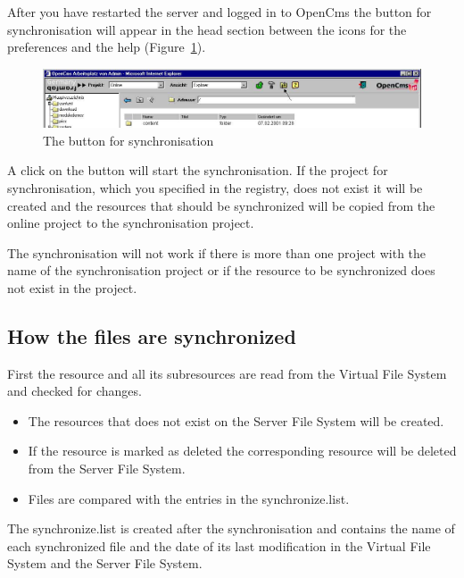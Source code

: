 After you have restarted the server and logged in to OpenCms the button for synchronisation will appear in the head section between the icons for the preferences and the help (Figure~\ref{syncicon}).

\begin{figure}[hbt]
\begin{center}
\includegraphics[width=\sgw]
                   {pics/synchronize/syncico} 
\caption[The button for synchronisation]
           {The button for synchronisation}
\label{syncicon}
\end{center}
\end{figure} 

A click on the button will start the synchronisation. If the project for synchronisation, which you specified in the registry, does not exist it will be created and the resources that should be synchronized will be copied from the online project to the synchronisation project. 

The synchronisation will not work if there is more than one project with the name of the synchronisation project or if the resource to be synchronized does not exist in the project.               

\subsection{How the files are synchronized}
First the resource and all its subresources are read from the Virtual File System and checked for changes.

\begin{itemize}
\item The resources that does not exist on the Server File System will be created. 
\item If the resource is marked as deleted the corresponding resource will be deleted from the Server File System.
\item Files are compared with the entries in the {\dir synchronize.list}. 
\end{itemize}

The {\dir synchronize.list} is created after the synchronisation and contains the name of each synchronized file and the date of its last modification in the Virtual File System and the Server File System. 

